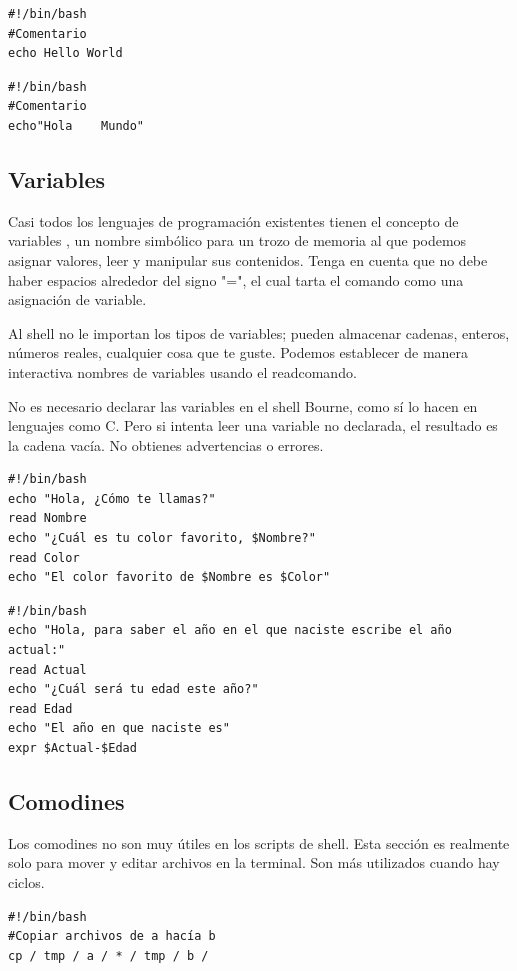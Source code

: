 \documentclass{article}
\begin{document}
\begin{verbatim}
#!/bin/bash
#Comentario
echo Hello World
\end{verbatim}

\begin{verbatim}
#!/bin/bash
#Comentario
echo"Hola    Mundo"
\end{verbatim}

\subsection{Variables}
Casi todos los lenguajes de programación existentes tienen el concepto de variables , un nombre simbólico para un trozo de memoria al que podemos asignar valores, leer y manipular sus contenidos.
Tenga en cuenta que no debe haber espacios alrededor del signo "=", el cual tarta el comando como una asignación de variable.

Al shell no le importan los tipos de variables; pueden almacenar cadenas, enteros, números reales, cualquier cosa que te guste. Podemos establecer de manera interactiva nombres de variables usando el readcomando.

No es necesario declarar las variables en el shell Bourne, como sí lo hacen en lenguajes como C. Pero si intenta leer una variable no declarada, el resultado es la cadena vacía. No obtienes advertencias o errores.

\begin{verbatim}
#!/bin/bash
echo "Hola, ¿Cómo te llamas?"
read Nombre
echo "¿Cuál es tu color favorito, $Nombre?"
read Color
echo "El color favorito de $Nombre es $Color"
\end{verbatim}

\begin{verbatim}
#!/bin/bash
echo "Hola, para saber el año en el que naciste escribe el año actual:"
read Actual
echo "¿Cuál será tu edad este año?"
read Edad
echo "El año en que naciste es"
expr $Actual-$Edad
\end{verbatim}

\subsection{Comodines}
Los comodines no son muy útiles en los scripts de shell. Esta sección es realmente solo para mover y editar archivos en la terminal. Son más utilizados cuando hay ciclos.
\begin{verbatim}
#!/bin/bash
#Copiar archivos de a hacía b
cp / tmp / a / * / tmp / b /
\end{verbatim}
\end{document}
